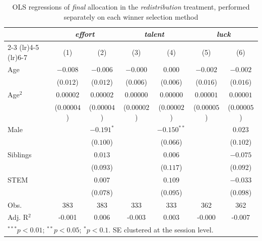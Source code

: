\begin{table}[htpb]
\centering
\footnotesize
\begin{tabular}{l cc cc cc}
\toprule
 & \multicolumn{2}{c}{\textit{effort}} & \multicolumn{2}{c}{\textit{talent}} & \multicolumn{2}{c}{\textit{luck}} \\
\cmidrule(lr){2-3} \cmidrule(lr){4-5} \cmidrule(lr){6-7}
 & (1) & (2) & (3) & (4) & (5) & (6) \\
\midrule
Age & $-0.008$ & $-0.006$ & $-0.000$ & $0.000$ & $-0.002$ & $-0.002$ \\
        & ($0.012$) & ($0.012$) & ($0.006$) & ($0.006$) & ($0.016$) & ($0.016$) \\
Age$^2$ & $0.00002$ & $0.00002$ & $0.00000$ & $0.00000$ & $0.00001$ & $0.00001$ \\
        & ($0.00004$) & ($0.00004$) & ($0.00002$) & ($0.00002$) & ($0.00005$) & ($0.00005$) \\
Male &  & $-0.191^{*}$ &  & $-0.150^{**}$ &  & $0.023$ \\
        &  & ($0.100$) &  & ($0.066$) &  & ($0.102$) \\
Siblings &  & $0.013$ &  & $0.006$ &  & $-0.075$ \\
        &  & ($0.093$) &  & ($0.117$) &  & ($0.092$) \\
STEM &  & $0.007$ &  & $0.109$ &  & $-0.033$ \\
        &  & ($0.078$) &  & ($0.095$) &  & ($0.098$) \\
\midrule
Obs. & 383 & 383 & 333 & 333 & 362 & 362 \\
Adj. R$^2$ & -0.001 & 0.006 & -0.003 & 0.003 & -0.000 & -0.007 \\
\bottomrule
\multicolumn{7}{l}{\footnotesize $^{***}p<0.01$; $^{**}p<0.05$; $^{*}p<0.1$. SE clustered at the session level.}
\end{tabular}
\caption{OLS regressions of \textit{final} allocation in the \textit{redistribution} treatment, performed separately on each winner selection method}
\label{table-b5}
\end{table}
